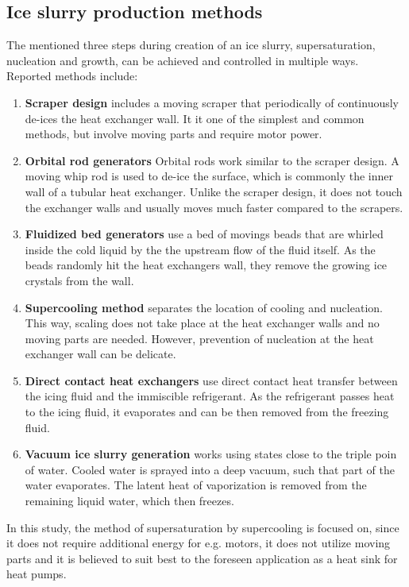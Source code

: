 \subsection{Ice slurry production methods}

The mentioned three steps during creation of an ice slurry, supersaturation, nucleation and growth, can be achieved and controlled in multiple ways. Reported methods include\citep{kauffeld_handbooks_2005, zhang_overview_2012, mouneer_heat_2010}:
\begin{enumerate}
  \item \textbf{Scraper design} includes a moving scraper that periodically of continuously de-ices the heat exchanger wall. It it one of the simplest and common methods, but involve moving parts and require motor power\citep{ernst_influence_2016}.
  \item \textbf{Orbital rod generators}
    Orbital rods work similar to the scraper design. A moving whip rod is used to de-ice the surface, which is commonly the inner wall of a tubular heat exchanger. Unlike the scraper design, it does not touch the exchanger walls and usually moves much faster compared to the scrapers.
  \item \textbf{Fluidized bed generators}
    use a bed of movings beads that are whirled inside the cold liquid by the the upstream flow of the fluid itself. As the beads randomly hit the heat exchangers wall, they remove the growing ice crystals from the wall.
  \item \textbf{Supercooling method} separates the location of cooling and nucleation. This way, scaling does not take place at the heat exchanger walls and no moving parts are needed. However, prevention of nucleation at the heat exchanger wall can be delicate.
  \item \textbf{Direct contact heat exchangers} use direct contact heat transfer between the icing fluid and the immiscible refrigerant. As the refrigerant passes heat to the icing fluid, it evaporates and can be then removed from the freezing fluid.
  \item \textbf{Vacuum ice slurry generation} works using states close to the triple poin of water. Cooled water is sprayed into a deep vacuum, such that part of the water evaporates. The latent heat of vaporization is removed from the remaining liquid water, which then freezes. 
\end{enumerate}

In this study, the method of supersaturation by supercooling is focused on, since it does not require additional energy for e.g. motors, it does not utilize moving parts and it is believed to suit best to the foreseen application as a heat sink for heat pumps.


